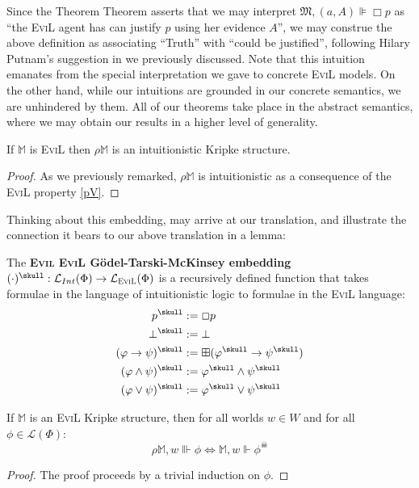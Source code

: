 Since the Theorem Theorem asserts that we may interpret
$\mathfrak{M},(a,A) \VDash \Box p$ as ``the \textsc{EviL} agent has
can justify $p$ using her evidence $A$'', we may construe the above
definition as associating ``Truth'' with ``could be justified'',
following Hilary Putnam's suggestion in
\cite{putnam_problem_1981} we previously discussed. Note that this intuition emanates from the
special interpretation we gave to concrete \textsc{EviL} models.  
On the other hand, while our intuitions are grounded in our concrete
semantics, we are unhindered by them.  All of our theorems take
place in the abstract semantics, where we may obtain our results in
a higher level of generality.

\begin{lemma}\label{companion-int}
If $\mathbb{M}$ is \textsc{EviL} then $\rho \mathbb{M}$ is an intuitionistic Kripke structure.
\end{lemma}
\begin{proof}
As we previously remarked, $\rho\mathbb{M}$ is intuitionistic as a
consequence of the \textsc{EviL} property \ref{pV}.
\end{proof}

Thinking about this embedding, may arrive at our translation, and
illustrate the connection it bears to our above translation in a lemma:

\begin{mydef}
The \textbf{\textsc{Evil} \textsc{EviL} G\"{o}del-Tarski-McKinsey embedding} $(\cdot)^\skull:
\mathcal{L}_{Int}(\Phi) \to \mathcal{L}_{\textup{\textsc{EviL}}}(\Phi)$ is a recursively
defined function that takes formulae in the language of intuitionistic
logic to formulae in the \textsc{EviL} language: 
\begin{align*}
  p^\skull & := \Box p \\
  \bot^\skull & := \bot \\
  (\phi \to \psi)^\skull & := \BP(\phi^\skull \to \psi^\skull) \\
  (\phi \wedge \psi)^\skull & := \phi^\skull \wedge \psi^\skull \\
  (\phi \vee \psi)^\skull & := \phi^\skull \vee \psi^\skull 
\end{align*}
\end{mydef}

\begin{lemma}\label{companion}
If $\mathbb{M}$ is an \textsc{EviL} Kripke structure,
  then for all worlds $w \in W$ and for all $\phi \in \mathcal{L}(\Phi)$:
\[ \rho\mathbb{M},w\Vvdash \phi \iff \mathbb{M},w\Vdash \phi^\skull 
\] 
\end{lemma}
\begin{proof}
The proof proceeds by a trivial induction on $\phi$.
\end{proof}

